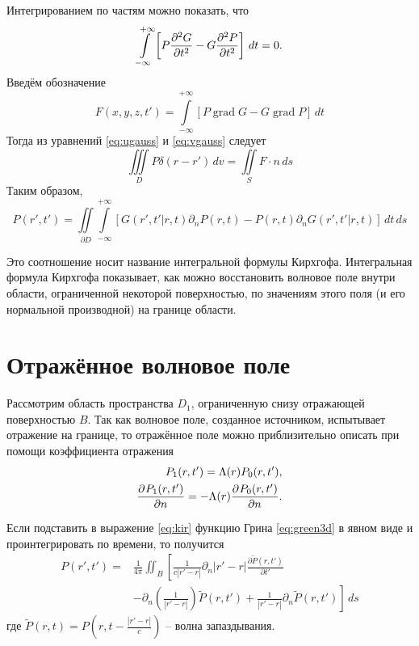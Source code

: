 \documentclass[a4paper, fontsize=14pt]{article}
\newcommand{\gradop}{\operatorname{grad}}
\begin{document}
	Интегрированием по частям можно показать, что 
	$$
	\int\limits_{-\infty}^{+\infty}\left[P\diff[2]{G}{t} - G \diff[2]{P}{t}\right]\,dt = 0.
	$$
	Введём обозначение 
	$$
		F(x,y,z,t') = \int\limits_{-\infty}^{+\infty} [P \gradop G - G \gradop P ]\, dt
	$$
	Тогда из уравнений \ref{eq:ugauss} и \ref{eq:vgauss} следует
	\begin{equation}
		\iiint\limits_D P\delta(r-r') \, dv = \iint\limits_S F \cdot n \, ds 
	\end{equation}
Таким образом, 
	\begin{equation}
		P(r',t') = \iint\limits_{\partial D} \int\limits_{-\infty}^{+\infty} 
	[G(r',t'|r,t)\partial_n P(r,t) 
	- P(r,t)\partial_n G(r',t'|r,t)] \,dt\,ds
	\label{eq:kir}
	\end{equation}
	
	
	Это соотношение носит название интегральной формулы Кирхгофа.
	Интегральная
	формула Кирхгофа показывает, как можно восстановить волновое поле внутри области,
	ограниченной некоторой поверхностью, по значениям этого поля (и его нормальной
	производной) на границе области.
	
	\section{Отражённое волновое поле}
	Рассмотрим область пространства $D_1$, ограниченную снизу отражающей поверхностью $B$. 
	Так как волновое поле, созданное источником, испытывает отражение на границе, то отражённое поле можно приблизительно описать при помощи коэффициента отражения\cite{zhdanov2007}
	\begin{eqnarray}
		P_1(r,t') = \Lambda(r) P_0(r,t'),\\
		\diff{P_1(r,t') }{n} = - \Lambda(r) \diff{P_0(r,t')}{n}.
	\end{eqnarray}
	
	Если подставить в выражение \ref{eq:kir} функцию Грина \ref{eq:green3d} в явном виде и проинтегрировать по времени, то получится \cite{magisters}
	\begin{align}
		P(r',t') =& \frac{1}{4\pi} \iint_B	\left[ \frac{1}{c|r'-r|}\partial_n|r'-r|\frac{\partial \tilde{P}(r,t')}{\partial t'} \right.\nonumber \\
		&\left. - \partial_n
		 \left(\frac{1}{|r'-r|}\right)\tilde{P}(r,t') +\frac{1}{|r'-r|}\partial_n \tilde{P}(r,t')\right]\,ds
		 \label{eq:kirgreen3d}
	\end{align}
	где $\tilde{P}(r,t) = P\left(r,t - \frac{|r'-r|}{c}\right)$ -- волна запаздывания.
	
\end{document}
